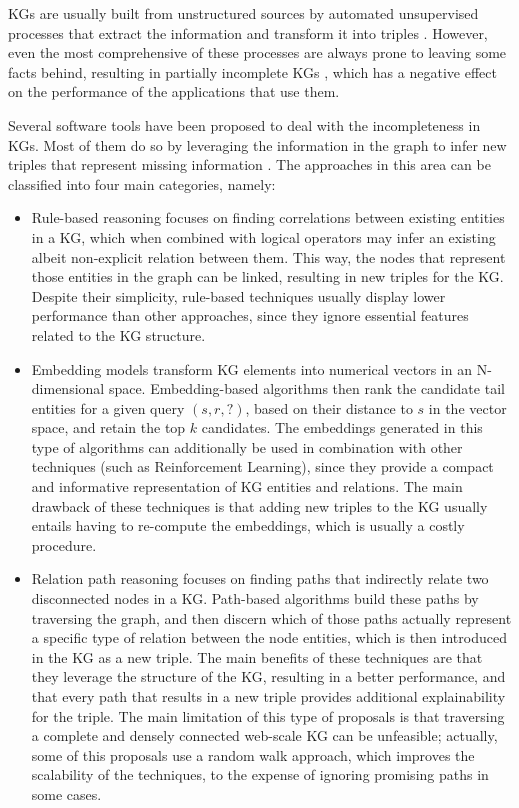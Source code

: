 KGs are usually built from unstructured sources by automated unsupervised processes that extract the information and transform it into triples 
. However, even the most comprehensive of these processes are always prone to leaving some facts behind, resulting in partially incomplete KGs 
, which has a negative effect on the performance of the applications that use them.

Several software tools have been proposed to deal with the incompleteness in KGs. Most of them do so by leveraging the information in the graph to infer new triples that represent missing information 
. The approaches in this area can be classified into  four main categories, namely:

\begin{itemize}
    \item Rule-based reasoning 
    focuses on finding correlations between existing entities in a KG, which when combined with logical operators may infer an existing albeit non-explicit relation between them. This way, the nodes that represent those entities in the graph can be linked, resulting in new triples for the KG. Despite their simplicity, rule-based techniques usually display lower performance than other approaches, since they ignore essential features related to the KG structure.
    
    \item Embedding models 
    transform KG elements into numerical vectors in an N-dimensional space. Embedding-based algorithms then rank the candidate tail entities for a given query \textit{$(s, r, ?)$}, based on their distance to $s$ in the vector space, and retain the top $k$ candidates. The  embeddings generated in this type of algorithms can additionally be used in combination with other techniques (such as Reinforcement Learning), since they provide a compact and informative representation of KG entities and relations. The main drawback of these techniques is that adding new triples to the KG usually entails having to re-compute the embeddings, which is usually a costly procedure.
    
    \item Relation path reasoning 
    focuses on finding paths that indirectly relate two disconnected nodes in a KG. Path-based algorithms build these paths by traversing the graph, and then discern which of those paths actually represent a specific type of relation between the node entities, which is then introduced in the KG as a new triple. The main benefits of these techniques are that they leverage the structure of the KG, resulting in a better performance, and that every path that results in a new triple provides additional explainability for the triple. The main limitation of this type of proposals is that traversing a complete and densely connected web-scale KG can be unfeasible; actually, some of this proposals use a random walk approach, which improves the scalability of the techniques, to the expense of ignoring promising paths in some cases. 
    

\end{itemize}
